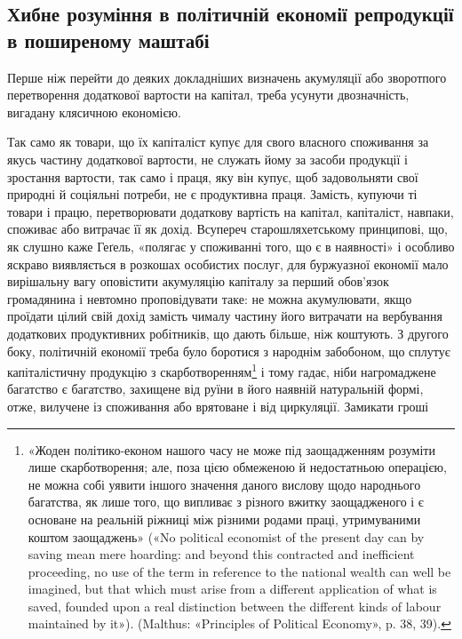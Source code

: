 
\subsection{Хибне розуміння в політичній економії репродукції
в поширеному маштабі
}

Перше ніж перейти до деяких докладніших визначень акумуляції
або зворотпого перетворення додаткової вартости на капітал,
треба усунути двозначність, вигадану клясичною економією.

Так само як товари, що їх капіталіст купує для свого власного
споживання за якусь частину додаткової вартости, не служать
йому за засоби продукції і зростання вартости, так само і праця,
яку він купує, щоб задовольняти свої природні й соціяльні
потреби, не є продуктивна праця. Замість, купуючи ті товари
і працю, перетворювати додаткову вартість на капітал, капіталіст,
навпаки, споживає або витрачає її як дохід. Всупереч
старошляхетському принципові, що, як слушно каже Геґель,
«полягає у споживанні того, що є в наявності» і особливо яскраво
виявляється в розкошах особистих послуг, для буржуазної економії
мало вирішальну вагу оповістити акумуляцію капіталу за
перший обов’язок громадянина і невтомно проповідувати таке:
не можна акумулювати, якщо проїдати цілий свій дохід замість
чималу частину його витрачати на вербування додаткових продуктивних
робітників, що дають більше, ніж коштують. З другого
боку, політичній економії треба було боротися з народнім
забобоном, що сплутує капіталістичну продукцію з скарботворенням\footnote{
«Жоден політико-економ нашого часу не може під заощадженням
розуміти лише скарботворення; але, поза цією обмеженою й недостатньою
операцією, не можна собі уявити іншого значення даного
вислову щодо народнього багатства, як лише того, що випливає з різного
вжитку заощадженого і є основане на реальній ріжниці між різними
родами праці, утримуваними коштом заощаджень» («No political
economist of the present day can by saving mean mere hoarding: and
beyond this contracted and inefficient proceeding, no use of the term in reference
to the national wealth can well be imagined, but that which must
arise from a different application of what is saved, founded upon a real
distinction between the different kinds of labour maintained by it»).
(Malthus: «Principles of Political Economy», p. 38, 39).
} і тому гадає, ніби нагромаджене багатство є багатство, захищене
від руїни в його наявній натуральній формі, отже, вилучене
із споживання або врятоване і від циркуляції. Замикати гроші
